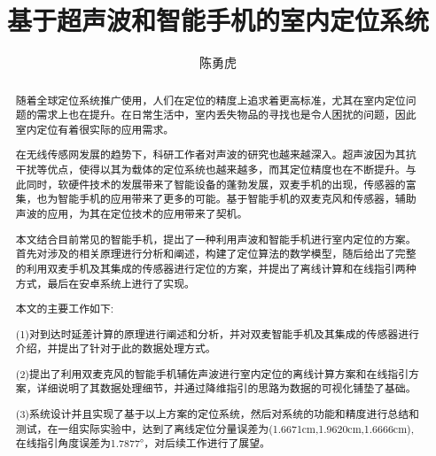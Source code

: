 \documentclass[winfonts,oneside]{njuthesis}
\title{基于超声波和智能手机的室内定位系统}
\author{陈勇虎}
\begin{document}
\maketitle
\makeenglishtitle

\begin{abstract}
	
	随着全球定位系统推广使用，人们在定位的精度上追求着更高标准，尤其在室内定位问题的需求上也在提升。在日常生活中，室内丢失物品的寻找也是令人困扰的问题，因此室内定位有着很实际的应用需求。
	
	在无线传感网发展的趋势下，科研工作者对声波的研究也越来越深入。超声波因为其抗干扰等优点，使得以其为载体的定位系统也越来越多，而其定位精度也在不断提升。与此同时，软硬件技术的发展带来了智能设备的蓬勃发展，双麦手机的出现，传感器的富集，也为智能手机的应用带来了更多的可能。基于智能手机的双麦克风和传感器，辅助声波的应用，为其在定位技术的应用带来了契机。
	
	本文结合目前常见的智能手机，提出了一种利用声波和智能手机进行室内定位的方案。首先对涉及的相关原理进行分析和阐述，构建了定位算法的数学模型，随后给出了完整的利用双麦手机及其集成的传感器进行定位的方案，并提出了离线计算和在线指引两种方式，最后在安卓系统上进行了实现。
	
	本文的主要工作如下:
	
	(1)对到达时延差计算的原理进行阐述和分析，并对双麦智能手机及其集成的传感器进行介绍，并提出了针对于此的数据处理方式。
	
	(2)提出了利用双麦克风的智能手机辅佐声波进行室内定位的离线计算方案和在线指引方案，详细说明了其数据处理细节，并通过降维指引的思路为数据的可视化铺垫了基础。
	
	(3)系统设计并且实现了基于以上方案的定位系统，然后对系统的功能和精度进行总结和测试，在一组实际实验中，达到了离线定位分量误差为(1.6671cm,1.9620cm,1.6666cm),在线指引角度误差为1.7877°，对后续工作进行了展望。

\end{abstract}
\end{document}
